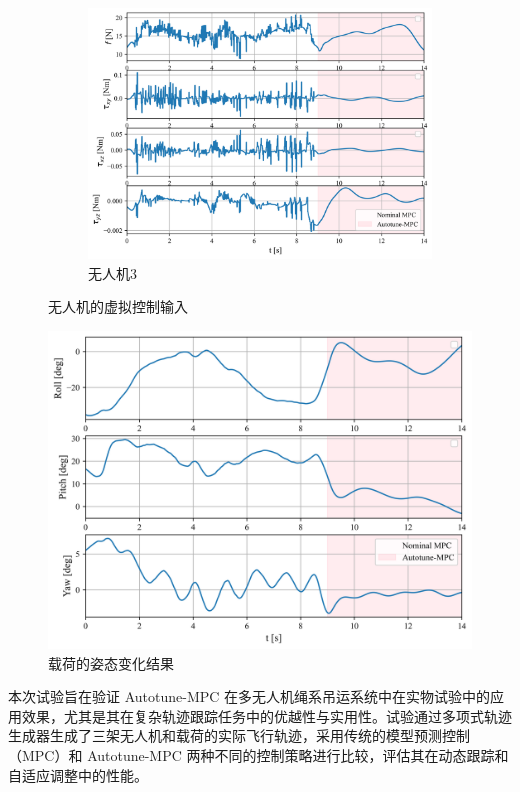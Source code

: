 \documentclass[lang=chs, degree=master, blindreview=true, winfonts=true]{yanputhesis}
\begin{document}
\begin{figure}[hbt!]
    \begin{subfigure}[b]{0.48\textwidth}  %
        \centering
        \includegraphics[width=\textwidth]{picture/kk/3.png}
        \caption{无人机3}
        \label{quadrotoru2}
    \end{subfigure}
    \caption{无人机的虚拟控制输入}
	\label{u}
\end{figure}

\begin{figure}[hbt!]
	\centering
	\includegraphics[width=30pc]{picture/kk/7.png} 
	\caption{载荷的姿态变化结果} 
	\label{x}
\end{figure}

本次试验旨在验证 Autotune-MPC 在多无人机绳系吊运系统中在实物试验中的应用效果，尤其是其在复杂轨迹跟踪任务中的优越性与实用性。试验通过多项式轨迹生成器生成了三架无人机和载荷的实际飞行轨迹，采用传统的模型预测控制（MPC）和 Autotune-MPC 两种不同的控制策略进行比较，评估其在动态跟踪和自适应调整中的性能。
\end{document}
